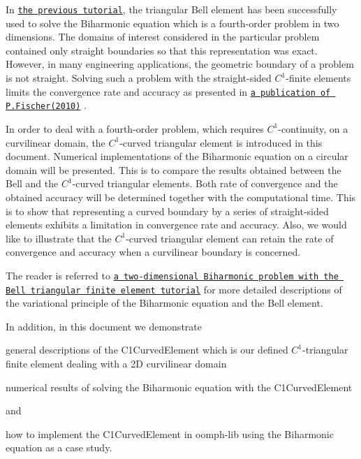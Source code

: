 In \href{../../../c1_element/bell_element/html/index.html}{\tt the previous tutorial}, the triangular Bell element has been successfully used to solve the Biharmonic equation which is a fourth-\/order problem in two dimensions. The domains of interest considered in the particular problem contained only straight boundaries so that this representation was exact. However, in many engineering applications, the geometric boundary of a problem is not straight. Solving such a problem with the straight-\/sided $ C^1 $-\/finite elements limits the convergence rate and accuracy as presented in \href{http://onlinelibrary.wiley.com/doi/10.1002/pamm.201010272/pdf}{\tt a publication of P.\+Fischer(2010)} .

In order to deal with a fourth-\/order problem, which requires $ C^1 $-\/continuity, on a curvilinear domain, the $ C^1 $-\/curved triangular element is introduced in this document. Numerical implementations of the Biharmonic equation on a circular domain will be presented. This is to compare the results obtained between the Bell and the $ C^1 $-\/curved triangular elements. Both rate of convergence and the obtained accuracy will be determined together with the computational time. This is to show that representing a curved boundary by a series of straight-\/sided elements exhibits a limitation in convergence rate and accuracy. Also, we would like to illustrate that the $ C^1 $-\/curved triangular element can retain the rate of convergence and accuracy when a curvilinear boundary is concerned.

The reader is referred to \href{../../../c1_element/bell_element/html/index.html}{\tt a two-\/dimensional Biharmonic problem with the Bell triangular finite element tutorial} for more detailed descriptions of the variational principle of the Biharmonic equation and the Bell element.

In addition, in this document we demonstrate


\begin{DoxyItemize}
\item general descriptions of the {\ttfamily C1\+Curved\+Element} which is our defined $ C^1 $-\/triangular finite element dealing with a 2D curvilinear domain
\end{DoxyItemize}
\begin{DoxyItemize}
\item numerical results of solving the Biharmonic equation with the {\ttfamily C1\+Curved\+Element} 
\end{DoxyItemize}and
\begin{DoxyItemize}
\item how to implement the {\ttfamily C1\+Curved\+Element} in {\ttfamily oomph-\/lib} using the Biharmonic equation as a case study.
\end{DoxyItemize}

